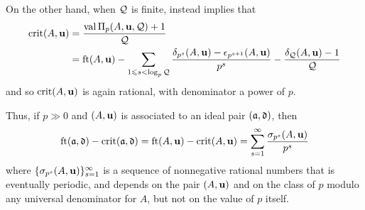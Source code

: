 \documentclass[11pt]{amsart}
\begin{document}
On the other hand, when $\mathcal{Q}$ is finite,  instead implies that
\begin{align*} 
\operatorname{crit}(A,\mathbf{u})& = \frac{\operatorname{val} \Pi_p(A,\mathbf{u}, \mathcal{Q}) +1}{\mathcal{Q}} \\ 
& = \operatorname{ft}(A, \mathbf{u}) -  \sum_{1 \leqslant s < \log_p \mathcal{Q}} \frac{\delta_{p^s}(A,\mathbf{u})-\epsilon_{p^{s+1}}(A,\mathbf{u})}{p^s} -  \frac{ \delta_{\mathcal{Q}}(A,\mathbf{u})-1}{\mathcal{Q}}
\end{align*}
and so $\operatorname{crit}(A,\mathbf{u})$ is again rational, with denominator a power of $p$.

Thus, if $p \gg 0$ and $(A,\mathbf{u})$ is associated to an ideal pair $(\mathfrak{a}, \mathfrak{d})$, then 
\[ \operatorname{ft}(\mathfrak{a}, \mathfrak{d}) - \operatorname{crit}(\mathfrak{a}, \mathfrak{d}) = \operatorname{ft}(A, \mathbf{u})-\operatorname{crit}(A,\mathbf{u}) = \sum_{s=1}^{\infty} \frac{ \sigma_{p^s}(A,\mathbf{u})}{p^s} \] 
where $\{ \sigma_{p^s}(A,\mathbf{u}) \}_{s=1}^{\infty}$ is a sequence of nonnegative rational numbers that is eventually periodic, and depends on the pair $(A,\mathbf{u})$ and on the class of $p$ modulo any universal denominator for $A$, but not on the value of $p$ itself.

\begin{remark}
\end{remark}

%
%
%
%
%
%
\end{document}
